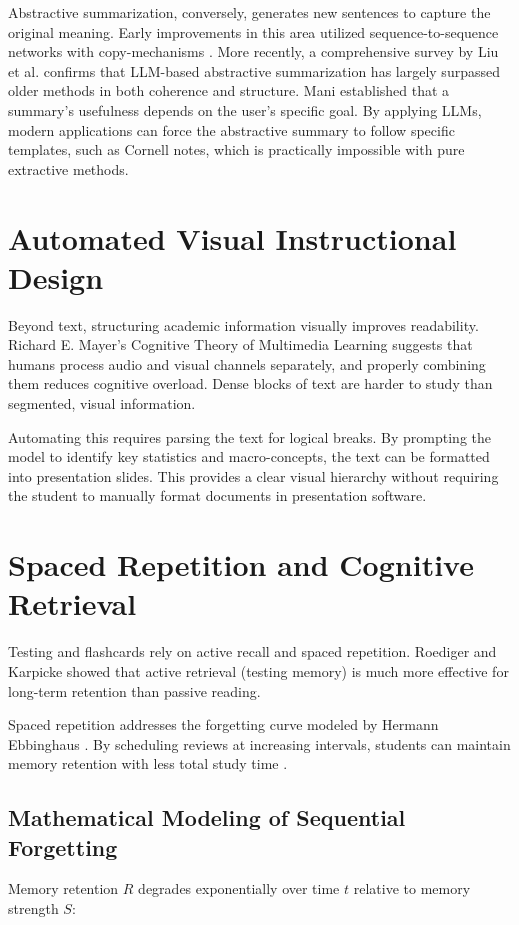 Abstractive summarization, conversely, generates new sentences to capture the original meaning. Early improvements in this area utilized sequence-to-sequence networks with copy-mechanisms \cite{see2017get}. More recently, a comprehensive survey by Liu et al. \cite{liu2023summary} confirms that LLM-based abstractive summarization has largely surpassed older methods in both coherence and structure. Mani \cite{mani2001automatic} established that a summary's usefulness depends on the user's specific goal. By applying LLMs, modern applications can force the abstractive summary to follow specific templates, such as Cornell notes, which is practically impossible with pure extractive methods.

\section{Automated Visual Instructional Design}
Beyond text, structuring academic information visually improves readability. Richard E. Mayer’s Cognitive Theory of Multimedia Learning \cite{mayer2014cambridge} suggests that humans process audio and visual channels separately, and properly combining them reduces cognitive overload. Dense blocks of text are harder to study than segmented, visual information. 

Automating this requires parsing the text for logical breaks. By prompting the model to identify key statistics and macro-concepts, the text can be formatted into presentation slides. This provides a clear visual hierarchy without requiring the student to manually format documents in presentation software.

\section{Spaced Repetition and Cognitive Retrieval}
Testing and flashcards rely on active recall and spaced repetition. Roediger and Karpicke \cite{roediger2006test} showed that active retrieval (testing memory) is much more effective for long-term retention than passive reading. 

Spaced repetition addresses the forgetting curve modeled by Hermann Ebbinghaus \cite{ebbinghaus1885memory}. By scheduling reviews at increasing intervals, students can maintain memory retention with less total study time \cite{cepeda2006distributed}.

\subsection{Mathematical Modeling of Sequential Forgetting}
Memory retention $R$ degrades exponentially over time $t$ relative to memory strength $S$:

